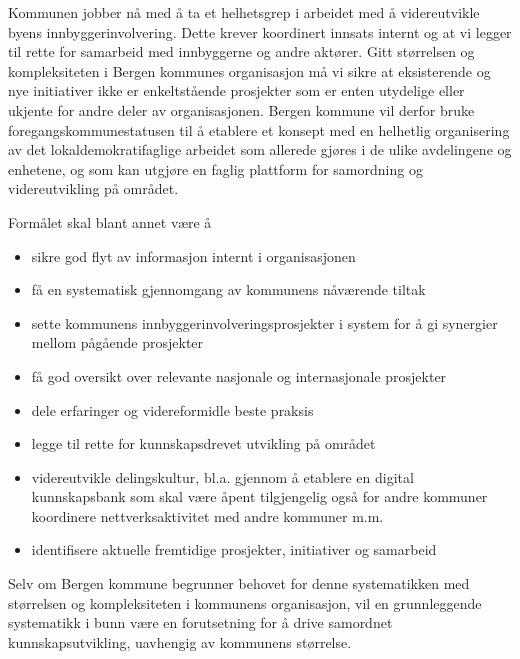 \documentclass[
  12pt,
  a4paper, 12pt]{article}
\providecommand{\tightlist}{%
  \setlength{\itemsep}{0pt}\setlength{\parskip}{0pt}}
\begin{document}
Kommunen jobber nå med å ta et helhetsgrep i arbeidet med å videreutvikle byens innbyggerinvolvering. Dette krever koordinert innsats internt og at vi legger til rette for samarbeid med innbyggerne og andre aktører. Gitt størrelsen og kompleksiteten i Bergen kommunes organisasjon må vi sikre at eksisterende og nye initiativer ikke er enkeltstående prosjekter som er enten utydelige eller ukjente for andre deler av organisasjonen. Bergen kommune vil derfor bruke foregangskommunestatusen til å etablere et konsept med en helhetlig organisering av det lokaldemokratifaglige arbeidet som allerede gjøres i de ulike avdelingene og enhetene, og som kan utgjøre en faglig plattform for samordning og videreutvikling på området.

Formålet skal blant annet være å

\begin{itemize}
\tightlist
\item
  sikre god flyt av informasjon internt i organisasjonen\\
\item
  få en systematisk gjennomgang av kommunens nåværende tiltak\\
\item
  sette kommunens innbyggerinvolveringsprosjekter i system for å gi synergier mellom pågående prosjekter\\
\item
  få god oversikt over relevante nasjonale og internasjonale prosjekter\\
\item
  dele erfaringer og videreformidle beste praksis\\
\item
  legge til rette for kunnskapsdrevet utvikling på området\\
\item
  videreutvikle delingskultur, bl.a. gjennom å etablere en digital kunnskapsbank som skal være åpent tilgjengelig også for andre kommuner
  koordinere nettverksaktivitet med andre kommuner m.m.\\
\item
  identifisere aktuelle fremtidige prosjekter, initiativer og samarbeid
\end{itemize}

Selv om Bergen kommune begrunner behovet for denne systematikken med størrelsen og kompleksiteten i kommunens organisasjon, vil en grunnleggende systematikk i bunn være en forutsetning for å drive samordnet kunnskapsutvikling, uavhengig av kommunens størrelse.
\end{document}
